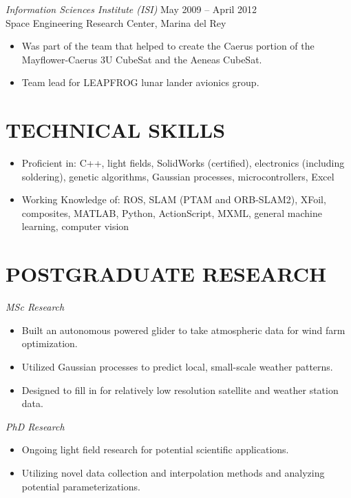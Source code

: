 \documentclass[10pt]{res} %
\begin{document}
\begin{resume}
{\sl Information Sciences Institute (ISI)} \hfill May 2009 -- April 2012 \\
Space Engineering Research Center, Marina del Rey 
\begin{itemize}\itemsep -2pt
\item Was part of the team that helped to create the Caerus portion of the Mayflower-Caerus 3U CubeSat and the Aeneas CubeSat.
\item Team lead for LEAPFROG lunar lander avionics group.
\end{itemize}
\section{TECHNICAL SKILLS}
\begin{itemize} \itemsep -2pt
\item Proficient in: C++, light fields, SolidWorks (certified), electronics (including soldering), genetic algorithms, Gaussian processes, microcontrollers, Excel
\item Working Knowledge of: ROS, SLAM (PTAM and ORB-SLAM2), XFoil, composites, MATLAB, Python, ActionScript, MXML, general machine learning, computer vision
\end{itemize}

\section{POSTGRADUATE RESEARCH}
{\sl MSc Research}
\begin{itemize} \itemsep -2pt
\item Built an autonomous powered glider to take atmospheric data for wind farm optimization.
\item Utilized Gaussian processes to predict local, small-scale weather patterns.
\item Designed to fill in for relatively low resolution satellite and weather station data.
\end{itemize}
{\sl PhD Research}
\begin{itemize} \itemsep -2pt
\item Ongoing light field research for potential scientific applications.
\item Utilizing novel data collection and interpolation methods and analyzing potential parameterizations.
\end{itemize}

\end{resume}
\end{document}
